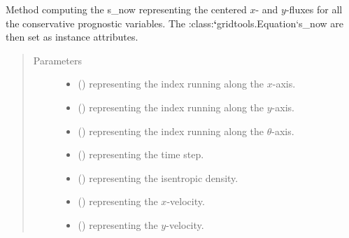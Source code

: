 \documentclass[letterpaper,10pt,english]{sphinxmanual}
\begin{document}
\begin{fulllineitems}

\begin{fulllineitems}
\label{\detokenize{api:dycore.flux_isentropic_centered.FluxIsentropicCentered._compute_horizontal_fluxes}}
Method computing the s\_now representing the centered \(x\)- and \(y\)-fluxes for all
the conservative prognostic variables. The :class:{\color{red}\bfseries{}{}`}gridtools.Equation{}`s\_now are then set as instance attributes.
\begin{quote}\begin{description}
\item[{Parameters}] \leavevmode\begin{itemize}
\item {} 
 () \textendash{}  representing the index running along the \(x\)-axis.

\item {} 
 () \textendash{}  representing the index running along the \(y\)-axis.

\item {} 
 () \textendash{}  representing the index running along the \(\theta\)-axis.

\item {} 
 () \textendash{}  representing the time step.

\item {} 
 () \textendash{}  representing the isentropic density.

\item {} 
 () \textendash{}  representing the \(x\)-velocity.

\item {} 
 () \textendash{}  representing the \(y\)-velocity.


\end{itemize}
\end{description}
\end{quote}
\end{fulllineitems}
\end{fulllineitems}
\end{document}
